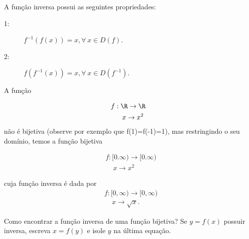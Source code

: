 \begin{obs}
	A função inversa possui as seguintes propriedades:
	\begin{description}
		\item[1:] $f^{-1}(f(x))=x, \forall~ x \in D(f).$
		\item[2:] $f(f^{-1}(x))=x, \forall~ x \in D(f^{-1}).$
	\end{description}
\end{obs}

\begin{exe}A função

	\begin{align}
	&f:\R\rightarrow\R \nonumber \\
	&~~~~~ x\rightarrow x^2
	\end{align}
não é bijetiva (observe por exemplo que f(1)=f(-1)=1), mas restringindo o seu domínio, temos a função bijetiva

	\begin{align}
&f:[0.\infty)\rightarrow[0.\infty) \nonumber \\
&~~~~~ x\rightarrow x^2
\end{align}

cuja função inversa é dada por
	\begin{align}
&f:[0,\infty)\rightarrow[0,\infty) \nonumber \\
&~~~~~ x\rightarrow \sqrt{x}.
\end{align}

	\end{exe}

Como encontrar a função inversa de uma função bijetiva? Se $y=f(x)$ possuir inversa, escreva $x=f(y)$ e isole $y$ na última equação.

